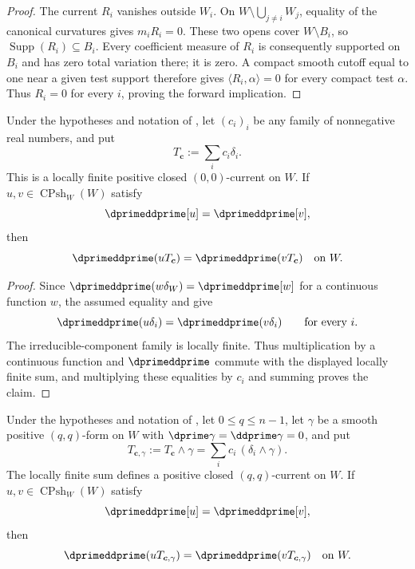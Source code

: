 \begin{proof}
The current $R_i$ vanishes outside $W_i$.  On
$W\setminus\bigcup_{j\ne i}W_j$, equality of the canonical curvatures
gives $m_iR_i=0$.  These two opens cover $W\setminus B_i$, so
$\operatorname{Supp}(R_i)\subseteq B_i$.  Every coefficient measure of
$R_i$ is consequently supported on $B_i$ and has zero total variation
there; it is zero.  A compact smooth cutoff equal to one near a given test
support therefore gives $\langle R_i,\alpha\rangle=0$ for every compact
test $\alpha$.  Thus $R_i=0$ for every $i$, proving the forward implication.
\end{proof}

\begin{corollary}
\label{cor:ch16-cpsh-component-diagonal-current}
Under the hypotheses and notation of
, let $(c_i)_i$ be any family of
nonnegative real numbers, and put
\[
                          T_{\boldsymbol c}:=\sum_i c_i\delta_i.
\]
This is a locally finite positive closed $(0,0)$-current on $W$.  If
$u,v\in\operatorname{CPsh}_W(W)$ satisfy
\[
                         \dprimeddprime[u]=\dprimeddprime[v],
\]
then
\[
        \dprimeddprime(uT_{\boldsymbol c})
              =\dprimeddprime(vT_{\boldsymbol c})
              \quad\text{on }W.
\]
\end{corollary}

\begin{proof}
Since $\dprimeddprime(w\delta_W)=\dprimeddprime[w]$ for a continuous
function $w$, the assumed equality and
 give
\[
        \dprimeddprime(u\delta_i)=\dprimeddprime(v\delta_i)
        \qquad\text{for every }i.
\]
The irreducible-component family is locally finite.  Thus multiplication by
a continuous function and $\dprimeddprime$ commute with the displayed
locally finite sum, and multiplying these equalities by $c_i$ and summing
proves the claim.
\end{proof}

\begin{corollary}
\label{cor:ch16-cpsh-smooth-component-current}
Under the hypotheses and notation of
, let
$0\leq q\leq n-1$, let $\gamma$ be a smooth positive
$(q,q)$-form on $W$ with
$\dprime\gamma=\ddprime\gamma=0$, and put
\[
 T_{\boldsymbol c,\gamma}
 :=T_{\boldsymbol c}\wedge\gamma
 =\sum_i c_i\,(\delta_i\wedge\gamma).
\]
The locally finite sum defines a positive closed $(q,q)$-current on
$W$.  If $u,v\in\operatorname{CPsh}_W(W)$ satisfy
\[
                         \dprimeddprime[u]=\dprimeddprime[v],
\]
then
\[
 \dprimeddprime(uT_{\boldsymbol c,\gamma})
 =\dprimeddprime(vT_{\boldsymbol c,\gamma})
 \quad\text{on }W.
\]
\end{corollary}

